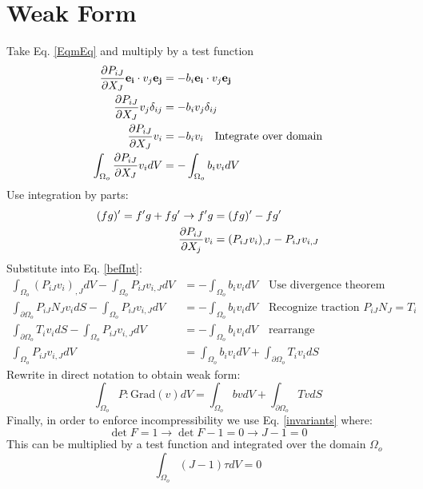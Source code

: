 \documentclass[12pt,3p]{article}
\begin{document}
\section{Weak Form}
Take Eq. \ref{EqmEq} and multiply by a test function 
\begin{align}\label{befInt}
\begin{split}
\pdv{P_{iJ}}{X_J} \mathbf{e_i} \cdot v_j \mathbf{e_j} &= - b_i \mathbf{e_i} \cdot v_j \mathbf{e_j} \\
\pdv{P_{iJ}}{X_J} v_j \delta_{ij} &= - b_i v_j \delta_{ij} \\
\pdv{P_{iJ}}{X_J} v_i &= - b_i v_i \quad \text{Integrate over domain} \\
\int_{\Omega_o} \pdv{P_{iJ}}{X_J} v_i dV &= - \int_{\Omega_o} b_i v_i dV
\end{split}
\end{align}
Use integration by parts: 
\begin{align*}
(fg)' = f'g + f g' \rightarrow f'g &= (fg)' - f g' \\
			\pdv{P_{iJ}}{X_j} v_i &= (P_{iJ} v_i)_{,J} - P_{iJ} v_{i,J}
\end{align*}
Substitute into Eq. \ref{befInt}:
\begin{align*}
\int_{\Omega_o} (P_{iJ} v_i)_{,J} dV - \int_{\Omega_o} P_{iJ} v_{i,J} dV &= - \int_{\Omega_o} b_i v_i dV \quad \text{Use divergence theorem} \\
\int_{\partial \Omega_o} P_{iJ} N_J v_i dS - \int_{\Omega_o} P_{iJ} v_{i,J} dV &= - \int_{\Omega_o} b_i v_i dV \quad \text{Recognize traction } P_{iJ} N_J = T_i\\
\int_{\partial \Omega_o} T_i v_i dS - \int_{\Omega_o} P_{iJ} v_{i,J} dV &= - \int_{\Omega_o} b_i v_i dV \quad \text{rearrange} \\
\int_{\Omega_o} P_{iJ} v_{i,J} dV &= \int_{\Omega_o} b_i v_i dV + \int_{\partial \Omega_o} T_i v_i dS 
\end{align*}
Rewrite in direct notation to obtain weak form: 
\begin{equation}\label{wForm}
 \int_{\Omega_o} P : \text{Grad}(v) dV = \int_{\Omega_o} b v dV + \int_{\partial \Omega_o} T v dS
\end{equation}
Finally, in order to enforce incompressibility we use Eq. \ref{invariants} where:
\begin{equation*}
\det F = 1 \rightarrow \det F - 1 = 0 \rightarrow J - 1 = 0
\end{equation*}
This can be multiplied by a test function and integrated over the domain $\Omega_o$
\begin{equation}\label{wFormIn}
\int_{\Omega_o} (J - 1) \tau dV = 0
\end{equation}
\end{document}
